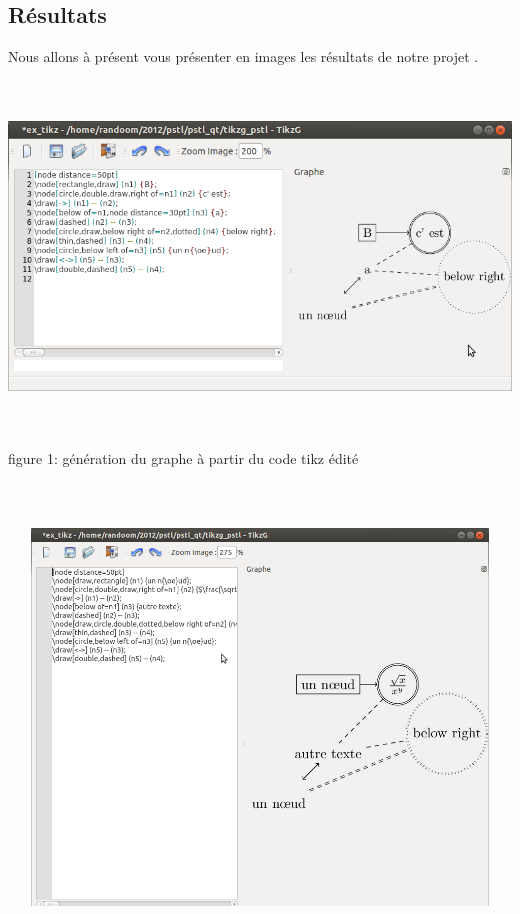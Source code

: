 \documentclass[a4paper]{report}
\begin{document}
\subsection{Résultats}
  Nous allons à présent vous présenter en images les résultats de notre projet .
\newline
  \includegraphics[width=15cm, height=10cm]{img/r_1.png} 
\newline
figure 1: génération du graphe à partir du code tikz édité
\\
\\
\\
\\
  \includegraphics[width=15cm, height=10cm]{img/r_41.png} 
\\
\end{document}
